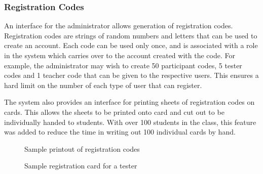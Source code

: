 \subsubsection{Registration Codes}
An interface for the administrator allows generation of registration codes. Registration
codes are strings of random numbers and letters that can be used to create an account.
Each code can be used only once, and is associated with a role in the system which carries
over to the account created with the code. For example, the administrator may wish to
create 50 participant codes, 5 tester codes and 1 teacher code that can be given
to the respective users. This ensures a hard limit on the number of each type of user
that can register.

The system also provides an interface for printing sheets of registration codes on cards.
This allows the sheets to be printed onto card and cut out to be individually handed
to students. With over 100 students in the class, this feature was added to reduce the
time in writing out 100 individual cards by hand.

\begin{figure}
\caption{Sample printout of registration codes}
\label{fig_registrationcodes}
\end{figure}

\begin{figure}
\caption{Sample registration card for a tester}
\label{fig_registrationcodes}
\end{figure}

